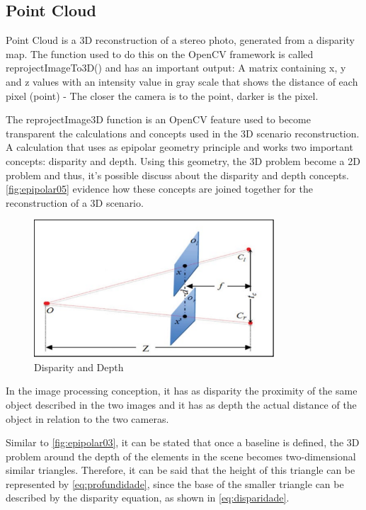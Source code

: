 \subsection{Point Cloud}

    Point Cloud is a 3D reconstruction of a stereo photo, generated from a disparity map. The function used to do this on the OpenCV framework is called reprojectImageTo3D() and has an important output: A matrix containing x, y and z values with an intensity value in gray scale that shows the distance of each pixel (point) - The closer the camera is to the point, darker is the pixel.
    
    The reprojectImage3D function is an OpenCV feature used to become transparent the calculations and concepts used in the 3D scenario reconstruction. A calculation that uses as epipolar geometry principle and works two important concepts: disparity and depth. Using this geometry, the 3D problem become a 2D problem and thus, it's possible discuss about the disparity and depth concepts. \autoref{fig:epipolar05} evidence how these concepts are joined together for the reconstruction of a 3D scenario.

    \begin{figure}[H]
     \caption{\label{fig:epipolar05}
Disparity and Depth}
     \begin{center}
        \includegraphics[width=0.8\textwidth]{images/mapaDisparidade.png}
     \end{center}
    \end{figure}
    
    In the image processing conception, it has as disparity the proximity of the same object described in the two images and it has as depth the actual distance of the object in relation to the two cameras.
    
    Similar to \autoref{fig:epipolar03}, it can be stated that once a baseline is defined, the 3D problem around the depth of the elements in the scene becomes two-dimensional similar triangles. Therefore, it can be said that the height of this triangle can be represented by \autoref{eq:profundidade}, since the base of the smaller triangle can be described by the disparity equation, as shown in \autoref{eq:disparidade}.    
    
